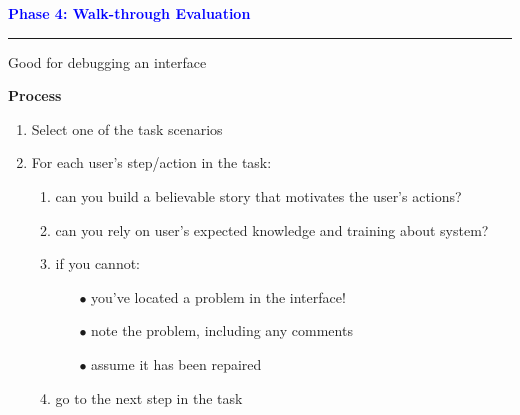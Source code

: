 \documentclass[pdf]{beamer}
\begin{document}
{%
\begin{frame}
	\vspace{8mm}
	\textcolor{Blue}{\textbf{\Large{Phase 4: Walk-through Evaluation}}}
    \textcolor{red}{\rule{10cm}{1mm}}

\bigskip
 Good for debugging an interface

\bigskip

 \textbf{Process}
 \begin{enumerate}[ 1]
 \item Select one of the task scenarios
 \item For each user's step/action in the task:
	\begin{enumerate}[ a)]
    \item can you build a believable story that motivates the user's actions?
    \item can you rely on user's expected knowledge and training about system?
    \item if you cannot:
    	\begin{itemize}
        \item[{$\bullet$}] you've located a problem in the interface!
        \item[{$\bullet$}] note the problem, including any comments
        \item[{$\bullet$}] assume it has been repaired
        \end{itemize}
    \item go to the next step in the task
    \end{enumerate}
 \end{enumerate}
\end{frame}}
\end{document}
